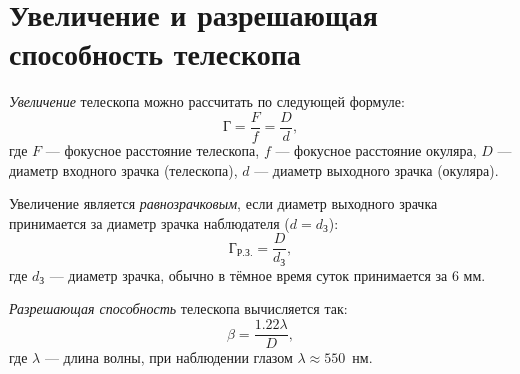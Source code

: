 \section{Увеличение и разрешающая способность телескопа}
\textit{Увеличение} телескопа можно рассчитать по следующей формуле:
\begin{equation}
\text{Г}=\frac{F}{f}=\frac{D}{d},
\end{equation}
где $F$ --- фокусное расстояние телескопа, $f$ --- фокусное расстояние окуляра, $D$ --- диаметр входного зрачка (телескопа), $d$ --- диаметр выходного зрачка (окуляра).

Увеличение является \textit{равнозрачковым}, если диаметр выходного зрачка принимается за диаметр зрачка наблюдателя ($d=d_{\text{З}}$):
\begin{equation}
\text{Г}_{\text{Р.З.}}=\frac{D}{d_{\text{З}}},
\end{equation}
где $d_{\text{З}}$ --- диаметр зрачка, обычно в тёмное время суток принимается за 6 мм.

\textit{Разрешающая способность} телескопа вычисляется так:
\begin{equation}
\beta=\frac{1.22\lambda}{D},
\end{equation}
где $\lambda$ --- длина волны, при наблюдении глазом $\lambda\approx 550$~нм.